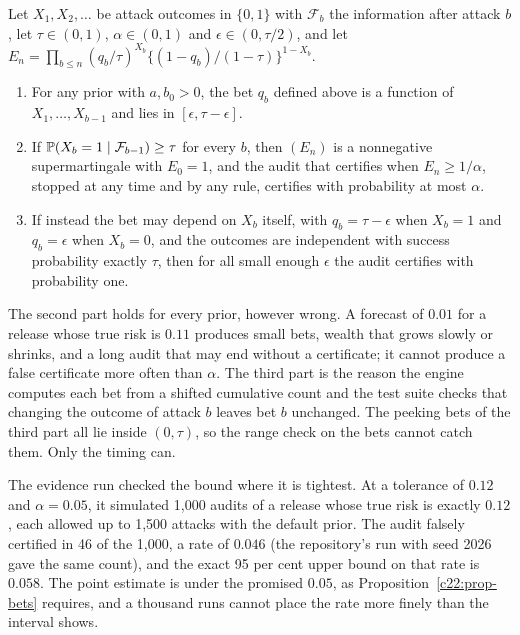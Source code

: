 \begin{proposition}\label{c22:prop-bets}
Let $X_1,X_2,\dots$ be attack outcomes in $\{0,1\}$ with $\mathcal F_b$ the information after attack $b$, let $\tau\in(0,1)$,
$\alpha\in(0,1)$ and $\epsilon\in(0,\tau/2)$, and let $E_n=\prod_{b\le n}(q_b/\tau)^{X_b}\{(1-q_b)/(1-\tau)\}^{1-X_b}$.
\begin{enumerate}
\item For any prior with $a,b_0>0$, the bet $q_b$ defined above is a function of $X_1,\dots,X_{b-1}$ and lies in $[\epsilon,\tau-\epsilon]$.
\item If $\mathbb{P}(X_b=1\mid\mathcal F_{b-1})\ge\tau$ for every $b$, then $(E_n)$ is a nonnegative supermartingale with $E_0=1$, and the audit that certifies when $E_n\ge1/\alpha$, stopped at any time and by any rule, certifies with probability at most $\alpha$.
\item If instead the bet may depend on $X_b$ itself, with $q_b=\tau-\epsilon$ when $X_b=1$ and $q_b=\epsilon$ when $X_b=0$, and the outcomes are independent with success probability exactly $\tau$, then for all small enough $\epsilon$ the audit certifies with probability one.
\end{enumerate}
\end{proposition}

The second part holds for every prior, however wrong. A forecast of $0.01$ for a release whose true
risk is $0.11$ produces small bets, wealth that grows slowly or shrinks, and a long audit that may
end without a certificate; it cannot produce a false certificate more often than $\alpha$. The third
part is the reason the engine computes each bet from a shifted cumulative count and the test suite
checks that changing the outcome of attack $b$ leaves bet $b$ unchanged. The peeking bets of the
third part all lie inside $(0,\tau)$, so the range check on the bets cannot catch them. Only the
timing can.

The evidence run checked the bound where it is tightest. At a tolerance of $0.12$ and $\alpha=0.05$, it
simulated 1,000 audits of a release whose true risk is exactly $0.12$, each allowed up to 1,500
attacks with the default prior. The audit falsely certified in 46 of the 1,000, a rate of $0.046$
(the repository's run with seed 2026 gave the same count), and the exact 95 per cent upper bound on that rate is $0.058$. The point estimate is under the
promised $0.05$, as Proposition~\ref{c22:prop-bets} requires, and a thousand runs cannot place the rate more finely
than the interval shows.

